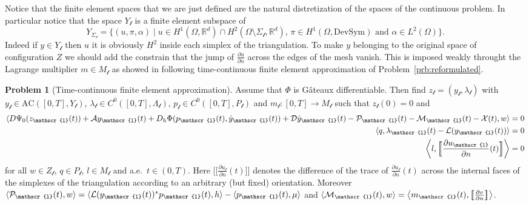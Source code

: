 \documentclass[a4paper,10pt,twoside]{amsbook}
\numberwithin{section}{chapter}
\numberwithin{equation}{chapter}
\theoremstyle{definition}
\newtheorem{prb}[prop]{Problem}
\DeclarePairedDelimiter{\dual}{\langle}{\rangle}
\newcommand{\dind}[2]{\frac{\partial #1}{\partial #2}}
\begin{document}
Notice that the finite element spaces that we are just defined are the natural distretization of the spaces of the continuous problem. In particular notice that the space $Y_\mathscr{l}$ is a finite element subspace of
\[
Y_{\Sigma_\mathscr{l}}=\{(u,\pi,\alpha)\;|\;\text{$u\in H^1(\Omega,\mathbb{R}^d)\cap H^2(\Omega\setminus\Sigma_\mathscr{l},\mathbb{R}^d)$, $\pi\in H^1(\Omega,\text{DevSym})$ and $\alpha\in L^2(\Omega)$}\}.
\]
Indeed if $y\in Y_\mathscr{l}$ then $u$ it is obviously $H^2$ inside each simplex of the triangulation. To make $y$ belonging to the original space of configuration $Z$ we should add the constrain that the jump of $\dind{u}{n}$ across the edges of the mesh vanish. This is imposed weakly throught the Lagrange multiplier $m\in M_\mathscr{l}$
as showed in following time-continuous finite element approximation of Problem~\ref{prb:reformulated}. \begin{prb}[Time-continuous finite element approximation]
\label{prb:fem}
Assume that $\Phi$ is G\^ateaux differentiable. Then find $z_\mathscr{l}=(y_\mathscr{l},\lambda_\mathscr{l})$ with $y_\mathscr{l}\in\text{AC}([0,T],Y_\mathscr{l})$, $\lambda_\mathscr{l}\in C^0([0,T],\Lambda_\mathscr{l})$, $p_\mathscr{l}\in C^0([0,T],P_\mathscr{l})$ and $m_\mathscr{l}\colon[0,T]\to M_\mathscr{l}$ such that $z_\mathscr{l}(0)=0$ and
\begin{align}
\dual{D\Psi_0(z_\mathscr{l}(t))+\mathcal{A}y_\mathscr{l}(t)+D_h\Phi(p_\mathscr{l}(t),\dot y_\mathscr{l}(t))+\mathcal{D}\dot y_\mathscr{l}(t)-\mathcal{P}_\mathscr{l}(t)-\mathcal{M}_\mathscr{l}(t)-\mathcal{X}(t),w}&=0 \\
\dual{q,\lambda_\mathscr{l}(t)-\mathcal{L}(y_\mathscr{l}(t))}&=0 \\
\left\langle l,\Big[\!\!\Big[\dind{u_\mathscr{l}}{n}(t)\Big]\!\!\Big]\right\rangle&=0
\end{align}
for all $w\in Z_\mathscr{l}$, $q\in P_\mathscr{l}$, $l\in M_\mathscr{l}$ and a.e.\ $t\in(0,T)$. Here $\big[\!\!\big[\dind{u_\mathscr{l}}{n}(t)\big]\!\!\big]$ denotes the difference of the trace of $\dind{u_\mathscr{l}}{n}(t)$ across the internal faces of the simplexes of the triangulation according to an arbitrary (but fixed) orientation. Moreover $\dual{\mathcal{P}_\mathscr{l}(t),w}=\dual{\mathcal{L}(y_\mathscr{l}(t))^*p_\mathscr{l}(t),h}-\dual{p_\mathscr{l}(t),\mu}$ and $\dual{\mathcal{M}_\mathscr{l}(t),w}=\left\langle m_\mathscr{l}(t),\big[\!\!\big[\dind{v}{n}\big]\!\!\big]\right\rangle$.
\end{prb}
\end{document}
